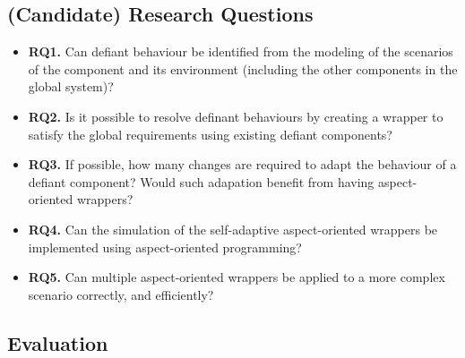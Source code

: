 \subsection{(Candidate) Research Questions}

\begin{itemize}
\item {\bf RQ1.} Can defiant behaviour be identified from the modeling of the scenarios of the component and its environment (including the  other components in the global system)? 

\item {\bf RQ2.} Is it possible to resolve definant behaviours by creating a wrapper to satisfy the global requirements using existing defiant components?

\item {\bf RQ3.} If possible, how many changes are required to adapt the behaviour of a defiant component? Would such adapation benefit from having aspect-oriented wrappers?

\item {\bf RQ4.} Can the simulation of the self-adaptive aspect-oriented wrappers be implemented using aspect-oriented programming?

\item {\bf RQ5.} Can multiple aspect-oriented wrappers be applied to a more complex scenario correctly, and efficiently? 
\end{itemize}

\subsection{Evaluation}


